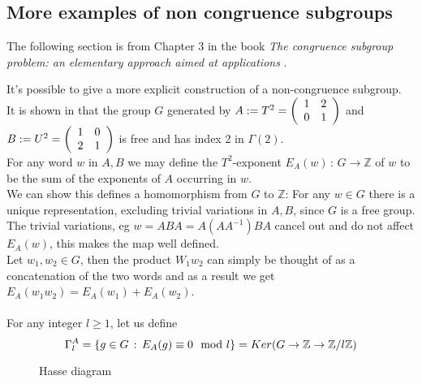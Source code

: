 \subsection{More examples of non congruence subgroups}
The following section is from Chapter 3 in the book  \textit{The congruence subgroup problem: an elementary approach aimed at applications} \citep{suryCongruence}.
\begin{example} \label{ex:noncongruenceEA}
It's possible to give a more explicit construction of a non-congruence subgroup.
\\
It is shown in \citep{suryCongruence} that the group $G$ generated by $A:=T^2 =\left(\begin{array}{ c c } 1 & 2 \\ 0 & 1 \end{array} \right) $ and $B:= U^2 = \left(\begin{array}{ c c } 1 & 0 \\ 2 & 1 \end{array} \right)$ is free and has index 2 in $\Gamma(2)$.\\
For any word $w$ in $ A, B$ we may define the $T^2$-exponent $E_A(w)\,: \, G \rightarrow \mathbb{Z}$ of $w$ to be the sum of the exponents of $A$ occurring in $w$. \\
We can show this defines a homomorphism from $G$ to $\mathbb{Z}$: For any $w \in G$ there is a unique representation, excluding trivial variations in $A,B$, since $G$ is a free group. The trivial variations, eg $ w = ABA = A(AA^{-1})BA$ cancel out and do not affect $E_A(w)$, this makes the map well defined. \\
Let $w_1, w_2 \in G$, then the product $W_1 w_2$ can simply be thought of as a concatenation of the two words and as a result we get $E_A(w_1 w_2) = E_A(w_1) + E_A(w_2)$. \\
\\
For any integer $l \geq 1$, let us define
$$\Gamma_{l}^A = \{ g \in G \, : \, E_A(g) \equiv 0 \mod l\} = Ker(G \rightarrow \mathbb{Z} \rightarrow \znz[l])$$
\begin{figure}
\centering

\caption{Hasse diagram} \label{fig:hasseDiagram}
\end{figure}


\end{example}
